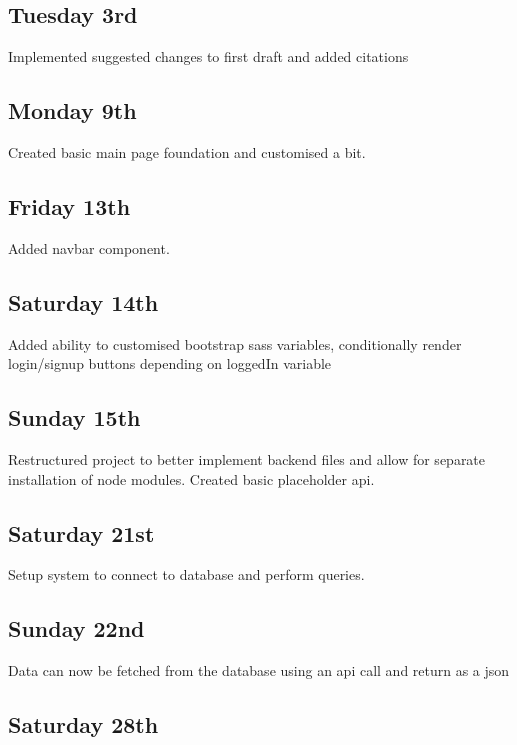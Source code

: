 \documentclass[]{final_report}
\begin{document}
\subsection{Tuesday 3rd} 

Implemented suggested changes to first draft and added citations

\subsection{Monday 9th} 

Created basic main page foundation and customised a bit.

\subsection{Friday 13th} 

Added navbar component.

\subsection{Saturday 14th} 

Added ability to customised bootstrap sass variables, conditionally render login/signup buttons depending on loggedIn variable

\subsection{Sunday 15th} 

Restructured project to better implement backend files and allow for separate installation of node modules. Created basic placeholder api.

\subsection{Saturday 21st} 

Setup system to connect to database and perform queries.

\subsection{Sunday 22nd} 

Data can now be fetched from the database using an api call and return as a json

\subsection{Saturday 28th} 
\end{document}
